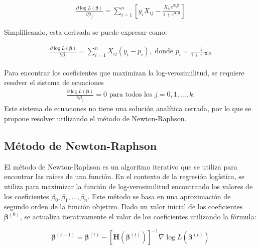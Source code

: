 \documentclass[a4paper]{report} %
\begin{document}
\begin{eqnarray}\label{Primer.Derivada.LV}
\frac{\partial \log L(\boldsymbol{\beta})}{\partial \beta_j} = \sum_{i=1}^{n} \left[ y_i X_{ij} - \frac{X_{ij} e^{\mathbf{X}_i \boldsymbol{\beta}}}{1 + e^{\mathbf{X}_i \boldsymbol{\beta}}} \right]
\end{eqnarray}

Simplificando, esta derivada se puede expresar como:

\begin{eqnarray}\label{Eq.PrimeraDerivada}
\frac{\partial \log L(\boldsymbol{\beta})}{\partial \beta_j} = \sum_{i=1}^{n} X_{ij} (y_i - p_i),\textrm{ donde }p_i = \frac{1}{1 + e^{-\mathbf{X}_i \boldsymbol{\beta}}}
\end{eqnarray}

Para encontrar los coeficientes que maximizan la log-verosimilitud, se requiere resolver el sistema de ecuaciones 
\begin{eqnarray}\label{Eq.Sol.ML}
\frac{\partial \log L(\boldsymbol{\beta})}{\partial \beta_j} = 0 \textrm{ para todos los }j = 0, 1, \ldots, k. 
\end{eqnarray}
Este sistema de ecuaciones no tiene una soluci\'on anal\'itica cerrada, por lo que se propone resolver utilizando el m\'etodo  de Newton-Raphson.

\subsection{M\'etodo de Newton-Raphson}

El m\'etodo de Newton-Raphson es un algoritmo iterativo que se utiliza para encontrar las ra\'ices de una funci\'on. En el contexto de la regresi\'on log\'istica, se utiliza para maximizar la funci\'on de log-verosimilitud encontrando los valores de los coeficientes $\beta_0, \beta_1, \ldots, \beta_n$. Este m\'etodo se basa en una aproximaci\'on de segundo orden de la funci\'on objetivo. Dado un valor inicial de los coeficientes $\boldsymbol{\beta}^{(0)}$, se actualiza iterativamente el valor de los coeficientes utilizando la f\'ormula:

\begin{equation}\label{Eq.Criterio0}
\boldsymbol{\beta}^{(t+1)} = \boldsymbol{\beta}^{(t)} - \left[ \mathbf{H}(\boldsymbol{\beta}^{(t)}) \right]^{-1} \nabla \log L(\boldsymbol{\beta}^{(t)})
\end{equation}
\end{document}
